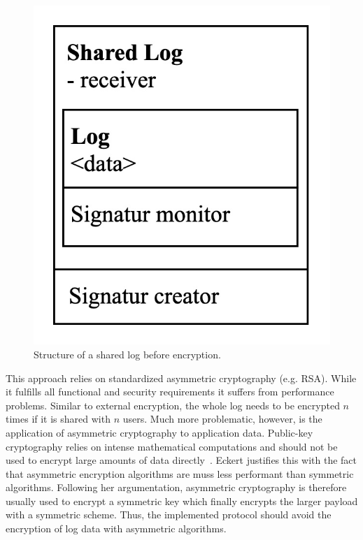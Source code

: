 \documentclass[../main.tex]{subfiles}
\begin{document}
\begin{figure}[ht]
    \includegraphics[scale=0.2]{../img/04/mutual_encryption.jpg}
    \centering
    \caption[Structure shared log]{Structure of a shared log before encryption.}
    \label{fig:mutual_encryption}
\end{figure}

This approach relies on standardized asymmetric cryptography (e.g. RSA).
While it fulfills all functional and security requirements it suffers from performance problems.
Similar to external encryption, the whole log needs to be encrypted $n$ times if it is shared with $n$ users.
Much more problematic, however, is the application of asymmetric cryptography to application data.
Public-key cryptography relies on intense mathematical computations and should not be used to encrypt large amounts of data directly~\cite[340]{Eckert2018}.
Eckert justifies this with the fact that asymmetric encryption algorithms are muss less performant than symmetric algorithms.
Following her argumentation, asymmetric cryptography is therefore usually used to encrypt a symmetric key which finally encrypts the larger payload with a symmetric scheme.
Thus, the implemented protocol should avoid the encryption of log data with asymmetric algorithms.
\end{document}
